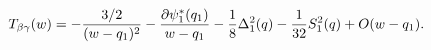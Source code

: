 \begin{equation}
T_{\beta\gamma}(w)    =   - { 3/2\over (w-q_1)^2} -
{\partial\psi^*_1(q_1)\over w-q_1} -{1\over8}\Delta_1^2(q)  - {
1\over 32}S_1^2(q) + O(w-q_1).
\end{equation}

